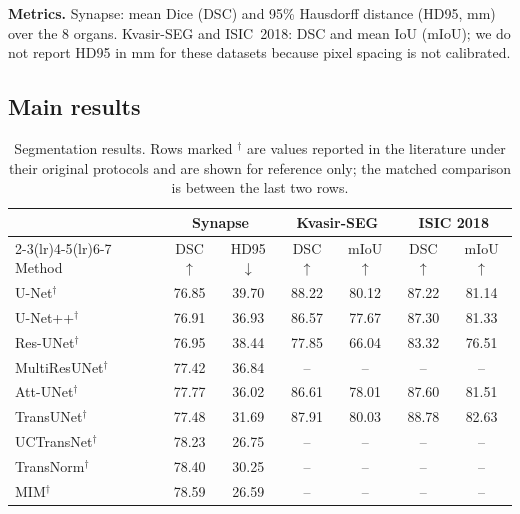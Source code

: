 \textbf{Metrics.} Synapse: mean Dice (DSC) and 95\% Hausdorff distance (HD95, mm) over the 8 organs. Kvasir-SEG and ISIC~2018: DSC and mean IoU (mIoU); we do not report HD95 in mm for these datasets because pixel spacing is not calibrated. 

\subsection{Main results}
\label{ssec:main}

\begin{table}[t]
  \caption{Segmentation results. Rows marked $^\dagger$ are values reported in the literature under their original protocols and are shown for reference only; the matched comparison is between the last two rows.}
  \label{tab:main}
  \centering
  \footnotesize
  \setlength{\tabcolsep}{2.2pt}
  \begin{tabular}{@{}lcccccc@{}}
    \toprule
    & \multicolumn{2}{c}{Synapse} & \multicolumn{2}{c}{Kvasir-SEG} & \multicolumn{2}{c}{ISIC 2018} \\
    \cmidrule(lr){2-3}\cmidrule(lr){4-5}\cmidrule(lr){6-7}
    Method & DSC$\uparrow$ & HD95$\downarrow$ & DSC$\uparrow$ & mIoU$\uparrow$ & DSC$\uparrow$ & mIoU$\uparrow$ \\
    \midrule
    U-Net$^\dagger$~\cite{ronneberger2015unet}      & 76.85 & 39.70 & 88.22 & 80.12 & 87.22 & 81.14 \\
    U-Net++$^\dagger$~\cite{zhou2018unetpp}         & 76.91 & 36.93 & 86.57 & 77.67 & 87.30 & 81.33 \\
    Res-UNet$^\dagger$~\cite{diakogiannis2020resunet} & 76.95 & 38.44 & 77.85 & 66.04 & 83.32 & 76.51 \\
    MultiResUNet$^\dagger$~\cite{ibtehaz2020multiresunet} & 77.42 & 36.84 & -- & -- & -- & -- \\
    Att-UNet$^\dagger$~\cite{oktay2018attention}    & 77.77 & 36.02 & 86.61 & 78.01 & 87.60 & 81.51 \\
    \midrule
    TransUNet$^\dagger$~\cite{chen2021transunet}    & 77.48 & 31.69 & 87.91 & 80.03 & 88.78 & 82.63 \\
    UCTransNet$^\dagger$~\cite{wang2022uctransnet}  & 78.23 & 26.75 & --    & --    & --    & --    \\
    TransNorm$^\dagger$~\cite{azad2022transnorm}    & 78.40 & 30.25 & --    & --    & --    & --    \\
    MIM$^\dagger$~\cite{wang2022mim}                & 78.59 & 26.59 & --    & --    & --    & --    \\

\end{tabular}
\end{table}
